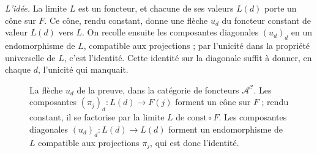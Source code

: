 \emph{L'idée.} La limite $L$ est un foncteur, et chacune de ses valeurs $L(d)$ porte un cône sur $F$. Ce cône, rendu constant, donne une flèche $u_d$ du foncteur constant de valeur $L(d)$ vers $L$. On recolle ensuite les composantes diagonales $(u_d)_d$ en un endomorphisme de $L$, compatible aux projections ; par l'unicité dans la propriété universelle de $L$, c'est l'identité. Cette identité sur la diagonale suffit à donner, en chaque $d$, l'unicité qui manquait.

\begin{figure}[htbp]
\centering
{}
\caption{La flèche $u_d$ de la preuve, dans la catégorie de foncteurs $\mathcal A^{\mathcal C}$. Les composantes $(\pi_j)_d : L(d) \to F(j)$ forment un cône sur $F$ ; rendu constant, il se factorise par la limite $L$ de $\mathrm{const} \circ F$. Les composantes diagonales $(u_d)_d : L(d) \to L(d)$ forment un endomorphisme de $L$ compatible aux projections $\pi_j$, qui est donc l'identité.}
\label{fig:bourbaki-469}
\end{figure}

